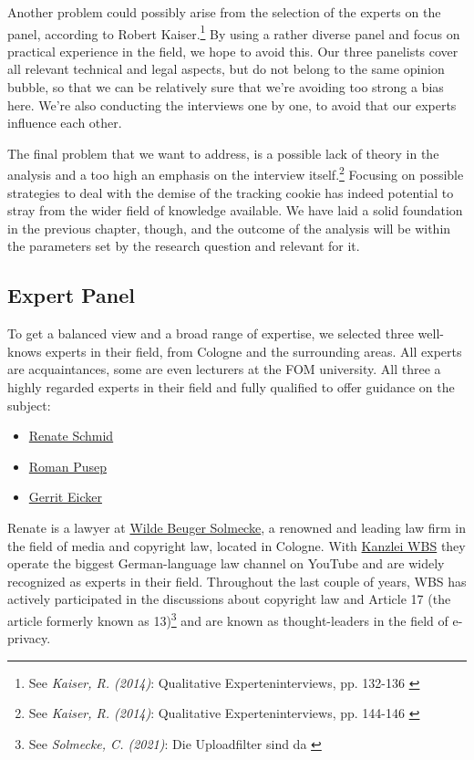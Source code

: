 Another problem could possibly arise from the selection of the experts on the panel, according to Robert Kaiser.\footnote{See \textit{Kaiser, R. (2014)}: Qualitative Experteninterviews, pp. 132-136 \cite{expertInterviews}} By using a rather diverse panel and focus on practical experience in the field, we hope to avoid this. Our three panelists cover all relevant technical and legal aspects, but do not belong to the same opinion bubble, so that we can be relatively sure that we're avoiding too strong a bias here. We're also conducting the interviews one by one, to avoid that our experts influence each other.

The final problem that we want to address, is a possible lack of theory in the analysis and a too high an emphasis on the interview itself.\footnote{See \textit{Kaiser, R. (2014)}: Qualitative Experteninterviews, pp. 144-146 \cite{expertInterviews}} Focusing on possible strategies to deal with the demise of the tracking cookie has indeed potential to stray from the wider field of knowledge available. We have laid a solid foundation in the previous chapter, though, and the outcome of the analysis will be within the parameters set by the research question and relevant for it.

\subsection{Expert Panel}

To get a balanced view and a broad range of expertise, we selected three well-knows experts in their field, from Cologne and the surrounding areas. All experts are acquaintances, some are even lecturers at the FOM university. All three a highly regarded experts in their field and fully qualified to offer guidance on the subject:

\begin{itemize}
 \item \href{https://www.linkedin.com/in/renate-schmid-535233113/}{Renate Schmid}
 \item \href{https://www.linkedin.com/in/roman-pusep-36b33374/}{Roman Pusep}
 \item \href{https://www.linkedin.com/in/eicker/}{Gerrit Eicker}
\end{itemize}

Renate is a lawyer at \href{https://www.wbs-law.de/}{Wilde Beuger Solmecke}, a renowned and leading law firm in the field of media and copyright law, located in Cologne. With \href{https://www.youtube.com/user/KanzleiWBS}{Kanzlei WBS} they operate the biggest German-language law channel on YouTube and are widely recognized as experts in their field. Throughout the last couple of years, WBS has actively participated in the discussions about copyright law and Article 17 (the article formerly known as 13)\footnote{See \textit{Solmecke, C. (2021)}: Die Uploadfilter sind da \cite{article17}} and are known as thought-leaders in the field of e-privacy.

